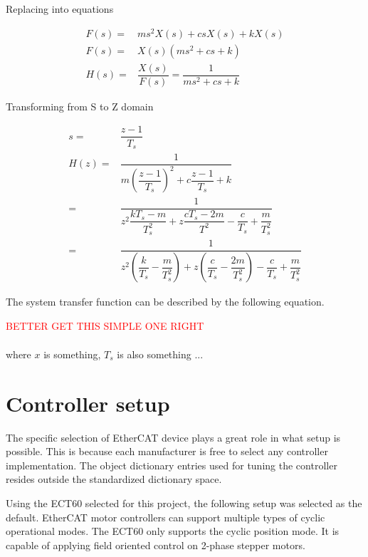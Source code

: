Replacing into equations

\begin{align}
	F(s) = & m s^2 X(s) + c s X(s) + k X(s) \\
	F(s) = & X(s) \left( m s^2 + c s + k \right) \\
	H(s) = & \dfrac{X(s)}{F(s)} = \dfrac{1}{m s^2 + c s + k}
\end{align}

Transforming from S to Z domain

\begin{align}
	s = & \dfrac{z - 1}{T_s} \\
	H(z) = & \dfrac{1}{m \left( \dfrac{z - 1}{T_s} \right)^2 + c \dfrac{z - 1}{T_s} + k} \\
	= & \dfrac{1}{ z^2 \dfrac{ k T_s - m }{ T^2_s } + z \dfrac{ c T_s - 2 m }{ T^2 } - \dfrac{c}{T_s} + \dfrac{m}{T^2_s} } \\
	= & \dfrac{1}{ z^2 \left( \dfrac{k}{T_s} - \dfrac{m}{T^2_s} \right) + z \left( \dfrac{c}{T_s} - \dfrac{2m}{T^2_s} \right) - \dfrac{c}{T_s} + \dfrac{m}{T^2_s} }
\end{align}

\begin{tcolorbox}
	The system transfer function can be described by the following equation.
	
	\textcolor{red}{BETTER GET THIS SIMPLE ONE RIGHT}
	
	\begin{align}
	\end{align}
	where $x$ is something, $T_s$ is also something ...
\end{tcolorbox}

\section{Controller setup}

The specific selection of EtherCAT device plays a great role in what setup is possible. 
This is because each manufacturer is free to select any controller implementation. 
The object dictionary entries used for tuning the controller resides outside the standardized dictionary space.

Using the ECT60 selected for this project, the following setup was selected as the default. 
EtherCAT motor controllers can support multiple types of cyclic operational modes. The ECT60 only supports the cyclic position mode. 
It is capable of applying field oriented control on 2-phase stepper motors. 

